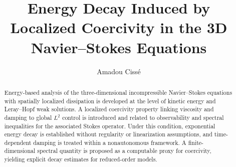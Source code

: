 \documentclass[preprint,12pt]{elsarticle}
\begin{document}
\begin{frontmatter}



\title{Energy Decay Induced by Localized Coercivity in the 3D Navier--Stokes Equations}

\author[]{Amadou Cissé}




\begin{abstract}
Energy-based analysis of the three-dimensional incompressible Navier--Stokes
equations with spatially localized dissipation is developed at the level of
kinetic energy and Leray--Hopf weak solutions.
A localized coercivity property linking viscosity and damping to global $L^2$
control is introduced and related to observability and spectral inequalities for
the associated Stokes operator.
Under this condition, exponential energy decay is established without regularity
or linearization assumptions, and time-dependent damping is treated within a
nonautonomous framework.
A finite-dimensional spectral quantity is proposed as a computable proxy for
coercivity, yielding explicit decay estimates for reduced-order models.
\end{abstract}


\end{frontmatter}
\end{document}

